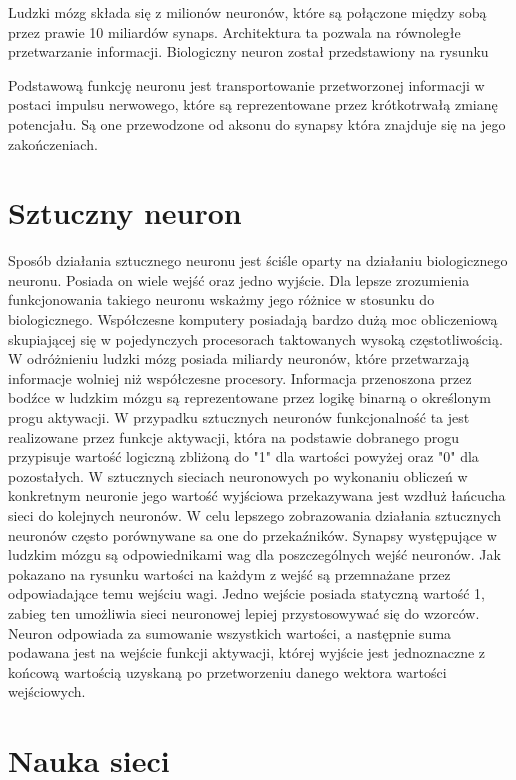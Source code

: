 Ludzki mózg składa się z milionów neuronów, które są połączone między sobą przez prawie 10 miliardów synaps. Architektura ta pozwala na równoległe przetwarzanie informacji. Biologiczny neuron został przedstawiony na rysunku %


Podstawową funkcję neuronu jest transportowanie przetworzonej informacji w postaci impulsu nerwowego, które są reprezentowane przez krótkotrwałą zmianę potencjału. Są one przewodzone od aksonu do synapsy która znajduje się na jego zakończeniach. 

\section{Sztuczny neuron}
Sposób działania sztucznego neuronu jest ściśle oparty na działaniu biologicznego neuronu. Posiada on wiele wejść oraz jedno wyjście. Dla lepsze zrozumienia funkcjonowania takiego neuronu wskażmy jego różnice w stosunku do biologicznego. %
Współczesne komputery posiadają bardzo dużą moc obliczeniową skupiającej się w pojedynczych procesorach taktowanych wysoką częstotliwością. W odróżnieniu ludzki mózg posiada miliardy neuronów, które przetwarzają informacje wolniej niż współczesne procesory. Informacja przenoszona przez bodźce w ludzkim mózgu są reprezentowane przez logikę binarną o określonym progu aktywacji. W przypadku sztucznych neuronów funkcjonalność ta jest realizowane przez funkcje aktywacji, która na podstawie dobranego progu przypisuje wartość logiczną zbliżoną do "1" dla wartości powyżej oraz "0" dla pozostałych. W sztucznych sieciach neuronowych po wykonaniu obliczeń w konkretnym neuronie jego wartość wyjściowa przekazywana jest wzdłuż łańcucha sieci do kolejnych neuronów. 
W celu lepszego zobrazowania działania sztucznych neuronów często porównywane sa one do przekaźników. Synapsy występujące w ludzkim mózgu są odpowiednikami wag dla poszczególnych wejść neuronów.
Jak pokazano na rysunku %
wartości na każdym z wejść są przemnażane przez odpowiadające temu wejściu wagi. Jedno wejście posiada statyczną wartość 1, zabieg ten umożliwia sieci neuronowej lepiej przystosowywać się do wzorców. Neuron odpowiada za sumowanie wszystkich wartości, a następnie suma podawana jest na wejście funkcji aktywacji, której wyjście jest jednoznaczne z końcową wartością uzyskaną po przetworzeniu danego wektora wartości wejściowych. 

\section{Nauka sieci}


